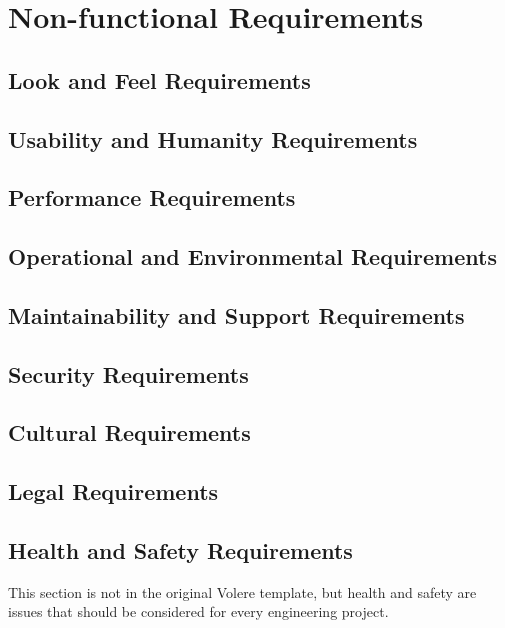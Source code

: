 \documentclass[12pt, titlepage]{article}
\begin{document}
\section{Non-functional Requirements}

	\subsection{Look and Feel Requirements}

	\subsection{Usability and Humanity Requirements}

	\subsection{Performance Requirements}

	\subsection{Operational and Environmental Requirements}

	\subsection{Maintainability and Support Requirements}

	\subsection{Security Requirements}

	\subsection{Cultural Requirements}

	\subsection{Legal Requirements}

	\subsection{Health and Safety Requirements}

	This section is not in the original Volere template, but health and safety are
	issues that should be considered for every engineering project.
\end{document}
